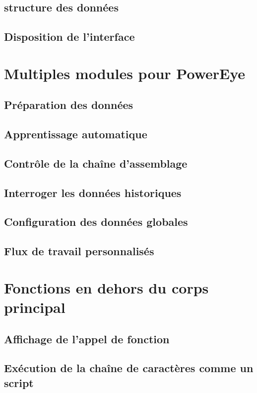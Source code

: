 \subsection{structure des données}
\subsection{Disposition de l'interface}

\section{Multiples modules pour PowerEye}
\subsection{Préparation des données}
\subsection{Apprentissage automatique}
\subsection{Contrôle de la chaîne d'assemblage} 
\subsection{Interroger les données historiques}
\subsection{Configuration des données globales}
\subsection{Flux de travail personnalisés}
\section{Fonctions en dehors du corps principal}
\subsection{Affichage de l'appel de fonction}
\subsection{Exécution de la chaîne de caractères comme un script}